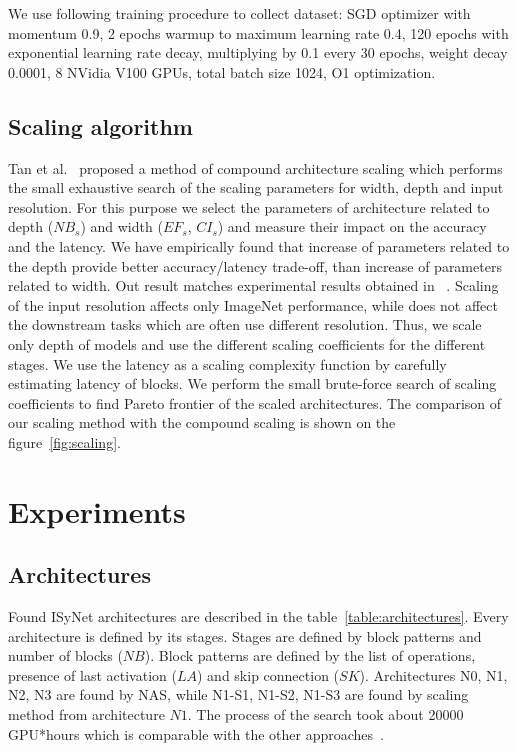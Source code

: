 \documentclass[letterpaper]{article}
\begin{document}
We use following training procedure to collect dataset: SGD optimizer with momentum 0.9, 2 epochs warmup to maximum learning rate 0.4, 120 epochs with exponential learning rate decay, multiplying by 0.1 every 30 epochs, weight decay 0.0001, 8 NVidia V100 GPUs, total batch size 1024, O1 optimization.

\subsection{Scaling algorithm}

Tan et al.~\cite{tan2020efficientnet} proposed a method of compound architecture scaling which performs the small exhaustive search of the scaling parameters for width, depth and input resolution. For this purpose we select the parameters of architecture related to depth ($NB_s$) and width ($EF_s$, $CI_s$) and measure their impact on the accuracy and the latency. We have empirically found that increase of parameters related to the depth provide better accuracy/latency trade-off, than increase of parameters related to width. Out result matches experimental results obtained in ~\cite{FastModelsFamilies}.
Scaling of the input resolution affects only ImageNet performance, while does not affect the downstream tasks which are often use different resolution.
Thus, we scale only depth of models and use the different scaling coefficients for the different stages.
We use the latency as a scaling complexity function by carefully estimating latency of blocks.
We perform the small brute-force search of scaling coefficients to find Pareto frontier of the scaled architectures.
The comparison of our scaling method with the compound scaling is shown on the figure~\ref{fig:scaling}.

\section{Experiments}
\subsection{Architectures}
Found ISyNet architectures are described in the table~\ref{table:architectures}.
Every architecture is defined by its stages.
Stages are defined by block patterns and number of blocks ($NB$).
Block patterns are defined by the list of operations, presence of last activation ($LA$) and skip connection ($SK$).
Architectures N0, N1, N2, N3 are found by NAS, while N1-S1, N1-S2, N1-S3 are found by scaling method from architecture $N1$. The process of the search took about 20000 GPU*hours which is comparable with the other approaches~\cite{NASSurvey}.
\end{document}
